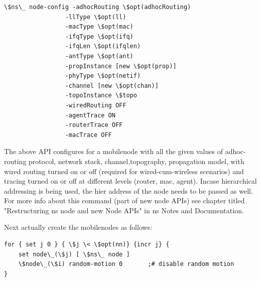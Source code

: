 \begin{verbatim}
\$ns\_ node-config -adhocRouting \$opt(adhocRouting) 
                 -llType \$opt(ll) 
                 -macType \$opt(mac) 
                 -ifqType \$opt(ifq) 
                 -ifqLen \$opt(ifqlen) 
                 -antType \$opt(ant) 
                 -propInstance [new \$opt(prop)] 
                 -phyType \$opt(netif) 
                 -channel [new \$opt(chan)] 
                 -topoInstance \$topo 
                 -wiredRouting OFF 
                 -agentTrace ON 
                 -routerTrace OFF 
                 -macTrace OFF
\end{verbatim} %

The above API configures for a mobilenode with all the given values of adhoc-routing protocol, network stack, channel,topography, propagation model, with wired routing turned on or off (required for wired-cum-wireless scenarios) and tracing turned on or off at different levels (router, mac, agent). Incase hierarchical addressing is being used, the hier address of the node needs to be passed as well. For more info about this command (part of new node APIs) see chapter titled "Restructuring ns node and new Node APIs" in ns Notes and Documentation.

Next actually create the mobilenodes as follows:
\begin{verbatim}
for { set j 0 } { \$j \< \$opt(nn)} {incr j} {
    set node\_(\$j) [ \$ns\_ node ]
    \$node\_(\$i) random-motion 0		;# disable random motion
}
\end{verbatim} %

